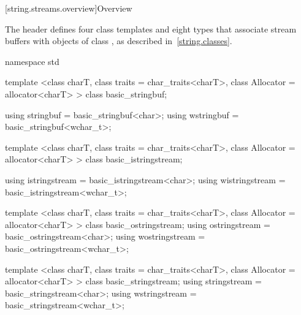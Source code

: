 [string.streams.overview]{Overview}

\pnum
The header
defines four
class templates
and eight types that associate stream buffers with objects of class
,
%
as described in~\ref{string.classes}.

%

%
%
%
%
%
%
%
%
%
%
%
%
\begin{codeblock}
namespace std {
  template <class charT, class traits = char_traits<charT>,
            class Allocator = allocator<charT> >
    class basic_stringbuf;

  using stringbuf  = basic_stringbuf<char>;
  using wstringbuf = basic_stringbuf<wchar_t>;

  template <class charT, class traits = char_traits<charT>,
            class Allocator = allocator<charT> >
    class basic_istringstream;

  using istringstream  = basic_istringstream<char>;
  using wistringstream = basic_istringstream<wchar_t>;

  template <class charT, class traits = char_traits<charT>,
            class Allocator = allocator<charT> >
    class basic_ostringstream;
  using ostringstream  = basic_ostringstream<char>;
  using wostringstream = basic_ostringstream<wchar_t>;

  template <class charT, class traits = char_traits<charT>,
            class Allocator = allocator<charT> >
    class basic_stringstream;
  using stringstream  = basic_stringstream<char>;
  using wstringstream = basic_stringstream<wchar_t>;
}
\end{codeblock}

